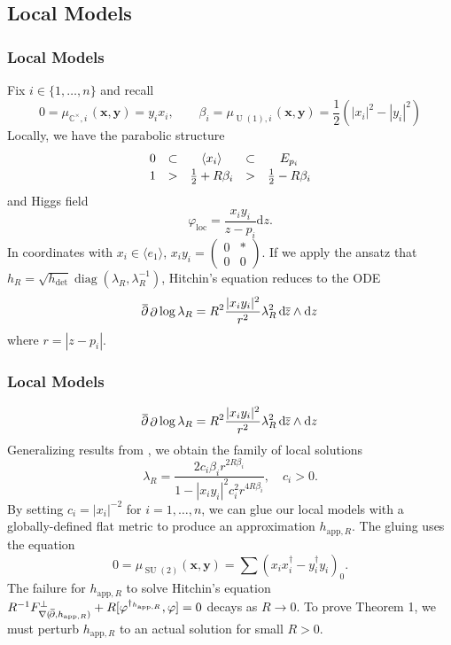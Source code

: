\documentclass[aspectratio=1610,10pt]{beamer}
\theoremstyle{definition}
\theoremstyle{named}
\renewcommand{\bar}[1]{\overline{\hspace{-1pt}{#1}\hspace{-.2pt}}}
\newcommand{\de}{\text{d}}
\newcommand{\C}{\mathbb{C}}
\DeclareMathOperator{\delbar}{\bar\partial}
\DeclareMathOperator{\del}{\partial}
\DeclareMathOperator{\diag}{diag}
\DeclareMathOperator{\U}{U}
\DeclareMathOperator{\SU}{SU}
\newcommand{\bx}{\mathbf{x}}
\newcommand{\by}{\mathbf{y}}
\begin{document}

\subsection{Local Models}
\begin{frame}
    \frametitle{Local Models}
    Fix $i\in\{1,\dots,n\}$ and recall
        $$0=\mu_{\C^\times\!,i\,}(\bx,\by)=y_ix_i,\qquad\beta_i=\mu_{\U(1),i\,}(\bx,\by)=\frac 12(|x_i|^2-|y_i|^2)$$
    Locally, we have the parabolic structure
    $$
    \begin{array}[column sep = -5pt]{ccccc}
        0   &\subset   &\langle x_i\rangle  &\subset    &E_{p_i}\\[2pt]
        1   &>         &\frac12+R\beta_i    &>          &\frac12-R\beta_i
    \end{array}
    $$
    and Higgs field
        $$\varphi_\mathrm{loc}=\frac{x_iy_i}{z-p_i}\de z.$$
    \pause
    In coordinates with $x_i\in\langle e_1\rangle$, $x_iy_i=\begin{pmatrix}0&*\\0&0\end{pmatrix}$.  If we apply the ansatz that $h_R=\sqrt{h_{\det}}\diag(\lambda_R,\lambda_R^{-1})$, Hitchin's equation reduces to the ODE
        $$\delbar\del\log\lambda_R=R^2\frac{|x_iy_i|^2}{r^2}\lambda_R^2\,\de\bar z\wedge\de z$$
    where $r=|z-p_i|$.
\end{frame}

\begin{frame}
    \frametitle{Local Models}
    \vspace{-10pt}
    $$\delbar\del\log\lambda_R=R^2\frac{|x_iy_i|^2}{r^2}\lambda_R^2\,\de\bar z\wedge\de z$$
    Generalizing results from \cite{KW18}, we obtain the family of local solutions
        $$\lambda_R=\frac{2c_i\beta_ir^{2R\beta_i}}{1-|x_iy_i|^2c_i^2r^{4R\beta_i}},\quad c_i>0.$$
    By setting $c_i=|x_i|^{-2}$ for $i=1,\dots,n$, we can glue our local models with a globally-defined flat metric to produce an approximation $h_{\mathrm{app},R}$.  The gluing uses the equation
        $$0=\mu_{\SU(2)}(\bx,\by)=\sum(x_ix_i^\dagger-y_i^\dagger y_i)_0.$$
    \pause
    The failure for $h_{\mathrm{app},R}$ to solve Hitchin's equation $R^{-1}F_{\nabla(\delbar,h_{\mathrm{app},R})}^\perp+R[\varphi^{\dagger_{h_{\mathrm{app},R}}},\varphi]=0$ decays as $R\to0$.  To prove Theorem 1, we must perturb $h_{\mathrm{app},R}$ to an actual solution for small $R>0$.
    \vfill
\end{frame}
\end{document}

